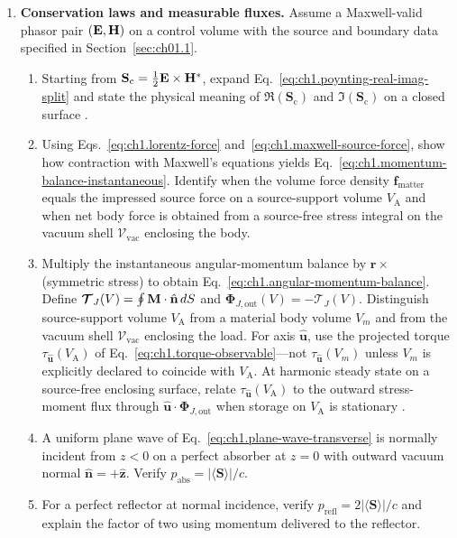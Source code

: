 \begin{enumerate}
\item \textbf{Conservation laws and measurable fluxes.}
Assume a Maxwell-valid phasor pair $(\mathbf{E},\mathbf{H})$ on a control volume with the source and boundary data specified in Section~\ref{sec:ch01.1}.
\begin{enumerate}[label=(\alph*)]
\item Starting from $\mathbf{S}_\mathrm{c}=\tfrac12\mathbf{E}\times\mathbf{H}^*$, expand Eq.~\eqref{eq:ch1.poynting-real-imag-split} and state the physical meaning of $\Re(\mathbf{S}_\mathrm{c})$ and $\Im(\mathbf{S}_\mathrm{c})$ on a closed surface \cite{poynting1884,stratton1941}.
\item Using Eqs.~\eqref{eq:ch1.lorentz-force} and~\eqref{eq:ch1.maxwell-source-force}, show how contraction with Maxwell's equations yields Eq.~\eqref{eq:ch1.momentum-balance-instantaneous}. Identify when the volume force density $\mathbf{f}_{\mathrm{matter}}$ equals the impressed source force on a source-support volume $V_{\mathrm{A}}$ and when net body force is obtained from a source-free stress integral on the vacuum shell $\mathcal{V}_{\mathrm{vac}}$ enclosing the body.
\item Multiply the instantaneous angular-momentum balance by $\mathbf{r}\times$ (symmetric stress) to obtain Eq.~\eqref{eq:ch1.angular-momentum-balance}. Define $\boldsymbol{\mathcal{T}}_J(V)=\oint\mathbf{M}\cdot\hat{\mathbf{n}}\,dS$ and $\boldsymbol{\Phi}_{J,\mathrm{out}}(V)=-\boldsymbol{\mathcal{T}}_J(V)$. Distinguish source-support volume $V_{\mathrm{A}}$ from a material body volume $V_m$ and from the vacuum shell $\mathcal{V}_{\mathrm{vac}}$ enclosing the load. For axis $\hat{\mathbf{u}}$, use the projected torque $\tau_{\hat{\mathbf{u}}}(V_{\mathrm{A}})$ of Eq.~\eqref{eq:ch1.torque-observable}---not $\tau_{\hat{\mathbf{u}}}(V_m)$ unless $V_m$ is explicitly declared to coincide with $V_{\mathrm{A}}$. At harmonic steady state on a source-free enclosing surface, relate $\tau_{\hat{\mathbf{u}}}(V_{\mathrm{A}})$ to the outward stress-moment flux through $\hat{\mathbf{u}}\cdot\boldsymbol{\Phi}_{J,\mathrm{out}}$ when storage on $V_{\mathrm{A}}$ is stationary \cite{beth1936,stratton1941}.
\item A uniform plane wave of Eq.~\eqref{eq:ch1.plane-wave-transverse} is normally incident from $z<0$ on a perfect absorber at $z=0$ with outward vacuum normal $\hat{\mathbf{n}}=+\hat{\mathbf{z}}$. Verify $p_{\mathrm{abs}}=|\langle\mathbf{S}\rangle|/c$.
\item For a perfect reflector at normal incidence, verify $p_{\mathrm{refl}}=2|\langle\mathbf{S}\rangle|/c$ and explain the factor of two using momentum delivered to the reflector.

\end{enumerate}
\end{enumerate}
